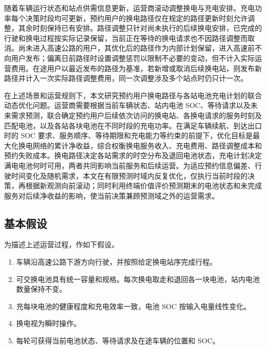 随着车辆运行状态和站点供需信息更新，运营商滚动调整换电与充电安排。充电功率每个决策时段均可更新，预约用户的换电路径仅在规定的路径更新时刻允许调整，其余时刻保持已有安排。路径调整只针对尚未执行的后续换电安排，已完成的行驶和换电过程按实际记录保留，当前正在等待的换电请求也不因路径调整而取消。尚未进入高速公路的用户，其优化后的路径作为内部计划保留，进入高速前不向用户发布；偏离日前路径时设置调整惩罚以限制不必要的变动，但不计入实际运营费用。在途用户以最近发布的路径为基准，若新增或取消后续换电站，则发布新路径并计入一次实际路径调整费用，同一次调整涉及多个站点时仍只计一次。

在上述场景和运营规则下，本文研究预约用户换电路径与各站电池充电计划的联合动态优化问题。运营商需要根据当前车辆状态、站内电池 SOC、等待请求以及未来需求预测，联合确定预约用户后续依次访问的换电站、各换电请求的服务时刻及匹配电池，以及各站各块电池在不同时段的充电功率。在满足车辆续航、到达出口时的 SOC 要求、服务顺序、等待期限和充电能力等约束的前提下，优化目标是最大化换电网络的累计净收益，综合权衡换电服务收入、充电费用、路径调整成本和预约失败成本。换电路径决定各站需求的时空分布及退回电池状态，充电计划决定满电电池何时可用，两者共同影响当前服务和后续运营。为适应预约信息偏差、行驶时间变化及随机需求，本文在有限预测时域内反复优化，仅执行当前时段的决策，再根据新观测向前滚动；同时利用终端价值评价预测期末的电池状态和未完成服务对后续净收益的影响，使当前决策兼顾预测域之外的运营需求。

\subsection{基本假设}
为描述上述运营过程，作如下假设。
\begin{enumerate}[label=\textbf{假设\arabic*.},leftmargin=4.4em]
  \item 车辆沿高速公路下游方向行驶，并按照给定换电站序完成行程。
  \item 可交换电池具有统一容量和规格。每次换电取走和退回各一块电池，站内电池数量保持不变。
  \item 充每块电池的健康程度和充电效率一致，电池 SOC 按输入电量线性变化。
  \item 换电视为瞬时操作。
  \item 每轮可获得当前电池状态、等待请求及在途车辆的位置和 SOC。
\end{enumerate}
